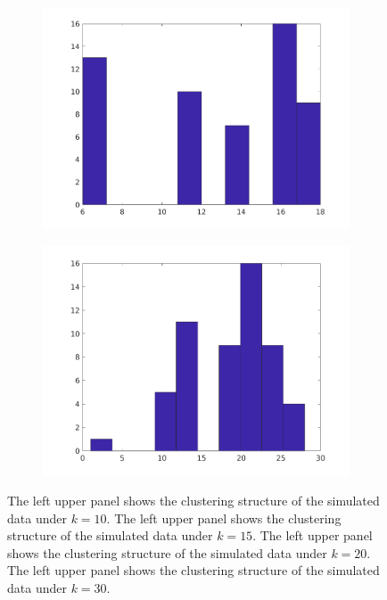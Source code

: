 \documentclass[11pt,letter]{article}%
\numberwithin{equation}{section}
\begin{document}
\begin{figure}[!h]
\begin{subfigure}[b]{0.45\textwidth}
            \includegraphics[width=\textwidth]{../FIG3.png}
    \label{fig:fig3}
    \end{subfigure}
    \begin{subfigure}[b]{0.45\textwidth}
            \centering
            \includegraphics[width=\textwidth]{../FIG4.png}
    \label{fig:fig4}
    \end{subfigure}
    \caption{\protect{} The left upper panel shows the clustering structure of the simulated data under $k=10$. The left upper panel shows the clustering structure of the simulated data under $k=15$. The left upper panel shows the clustering structure of the simulated data under $k=20$. The left upper panel shows the clustering structure of the simulated data under $k=30$.}
\end{figure}
\end{document}
